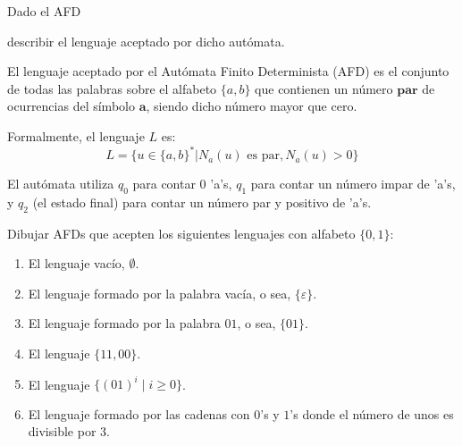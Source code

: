 \begin{ejercicio}
Dado el AFD
\begin{figure}[H]
    \centering
\end{figure}
describir el lenguaje aceptado por dicho autómata.
\end{ejercicio}

\begin{solucion}
El lenguaje aceptado por el Autómata Finito Determinista (AFD) es el conjunto de todas las palabras sobre el alfabeto $\{a, b\}$ que contienen un número $\mathbf{par}$ de ocurrencias del símbolo $\mathbf{a}$, siendo dicho número mayor que cero.

Formalmente, el lenguaje $L$ es:
$$L = \{u \in \{a, b\}^{*} | N_a(u) \text{ es par}, N_a(u) > 0\}$$

El autómata utiliza $q_0$ para contar 0 'a's, $q_1$ para contar un número impar de 'a's, y $q_2$ (el estado final) para contar un número par y positivo de 'a's.
\end{solucion}

\begin{ejercicio}
Dibujar AFDs que acepten los siguientes lenguajes con alfabeto $\{0, 1\}$:
\begin{enumerate}
    \item El lenguaje vacío, $\emptyset$.
    \item El lenguaje formado por la palabra vacía, o sea, $\{\varepsilon\}$.
    \item El lenguaje formado por la palabra $01$, o sea, $\{01\}$.
    \item El lenguaje $\{11, 00\}$.
    \item El lenguaje $\{(01)^i \mid i \geq 0\}$.
    \item El lenguaje formado por las cadenas con $0$'s y $1$'s donde el número de unos es divisible por $3$.
\end{enumerate}
\end{ejercicio}

